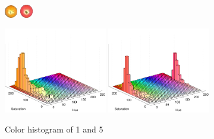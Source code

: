 \begin{figure}[H]
\centering
\subfloat
{
	\includegraphics[width=0.05\textwidth]{images/balls/1.png}
}
\hspace{0.4\textwidth}
\subfloat
{
	\includegraphics[width=0.05\textwidth]{images/balls/5.png}
}

\subfloat
{
	\includegraphics[width=0.4\textwidth]{images/ballhist/1}
}
\subfloat
{
	\includegraphics[width=0.4\textwidth]{images/ballhist/5}
}
\caption{Color histogram of 1 and 5}
\label{fig:wrongcamera}
\end{figure} 


